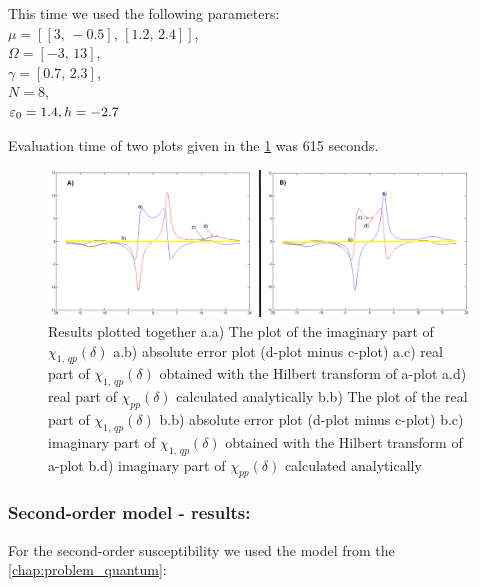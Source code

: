 \documentclass[12pt,twoside,a4paper]{article}
\numberwithin{equation}{subsection}
\numberwithin{figure}{subsection}
\begin{document}
This time we used the following parameters: \\
$\mu = [[3, \, - 0.5], \,[1.2, \,2.4]]$, \\ 
$\Omega =[ - 3, \,13]$, \\
$\gamma =[0.7, \,2.3]$, \\ 
$N=8$, \\ 
${\varepsilon_{0}}=1.4, \\
h= - 2.7$

Evaluation time of two plots given in the \ref{fig:nc_qp1} was 615 seconds.

\begin{figure}
  \includegraphics[width=150mm]{img/nc_qp1.png}
  \caption{Results plotted together 
    a.a) The plot of the imaginary part of ${\chi_{1, \,qp}}(\delta )$
    a.b) absolute error plot (d-plot minus c-plot) 
    a.c) real part of ${\chi_{1, \,qp}}(\delta )$ obtained with the Hilbert transform of a-plot 
    a.d) real part of ${\chi_{pp}}(\delta )$ calculated analytically 
    b.b) The plot of the real part of ${\chi_{1, \,qp}}(\delta )$ 
    b.b) absolute error plot (d-plot minus c-plot) 
    b.c) imaginary part of ${\chi_{1, \,qp}}(\delta )$ obtained with the Hilbert transform of a-plot 
    b.d) imaginary part of ${\chi_{pp}}(\delta )$ calculated analytically  
    \label{fig:nc_qp1}
  }
\end{figure}

\subsubsection*{Second-order model - results:}

For the second-order susceptibility we used the model from the \ref{chap:problem_quantum}:
\end{document}
